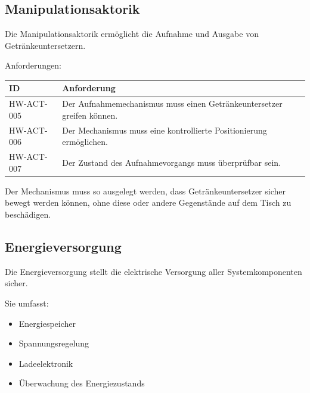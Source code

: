 \subsection{Manipulationsaktorik}\label{manipulationsaktorik}

Die Manipulationsaktorik ermöglicht die Aufnahme und Ausgabe von
Getränkeuntersetzern.

Anforderungen:

\begin{longtable}[]{@{}
  >{\raggedright\arraybackslash}p{}
  >{\raggedright\arraybackslash}p{}@{}}
\toprule\noalign{}
\begin{minipage}[b]{\linewidth}\raggedright
ID
\end{minipage} & \begin{minipage}[b]{\linewidth}\raggedright
Anforderung
\end{minipage} \\
\midrule\noalign{}
\endhead
\bottomrule\noalign{}
\endlastfoot
HW-ACT-005 & Der Aufnahmemechanismus muss einen Getränkeuntersetzer
greifen können. \\
HW-ACT-006 & Der Mechanismus muss eine kontrollierte Positionierung
ermöglichen. \\
HW-ACT-007 & Der Zustand des Aufnahmevorgangs muss überprüfbar sein. \\
\end{longtable}

Der Mechanismus muss so ausgelegt werden, dass Getränkeuntersetzer
sicher bewegt werden können, ohne diese oder andere Gegenstände auf dem
Tisch zu beschädigen.

\subsection{Energieversorgung}\label{energieversorgung}

Die Energieversorgung stellt die elektrische Versorgung aller
Systemkomponenten sicher.

Sie umfasst:

\begin{itemize}
\tightlist
\item
  Energiespeicher
\item
  Spannungsregelung
\item
  Ladeelektronik
\item
  Überwachung des Energiezustands
\end{itemize}

